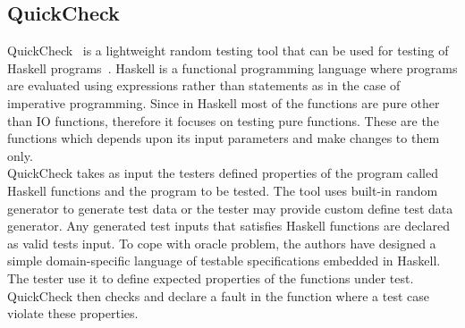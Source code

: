 {%

\subsection{QuickCheck}
QuickCheck~\cite{Claessen2000} is a lightweight random testing tool that can be used for testing of Haskell programs~\cite{Hudak2007}. Haskell is a functional programming language where programs are evaluated using expressions rather than statements as in the case of imperative programming. Since in Haskell most of the functions are pure other than IO functions, therefore it focuses on testing pure functions. These are the functions which depends upon its input parameters and make changes to them only. \\
QuickCheck takes as input the testers defined properties of the program called Haskell functions and the program to be tested. The tool uses built-in random generator to generate test data or the tester may provide custom define test data generator. Any generated test inputs that satisfies Haskell functions are declared as valid tests input. To cope with oracle problem, the authors have designed a simple domain-specific language of testable specifications embedded in Haskell. The tester use it to define expected properties of the functions under test. QuickCheck then checks and declare a fault in the function where a test case violate these properties.   


}
